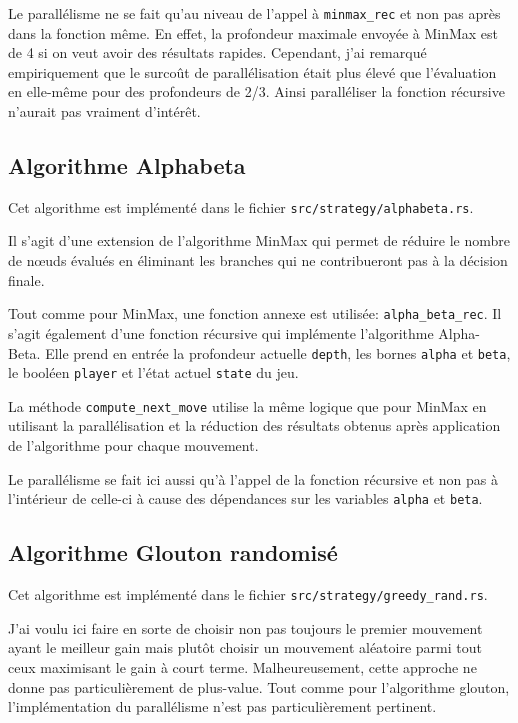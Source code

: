 \documentclass[10pt]{article}
\begin{document}
Le parallélisme ne se fait qu'au niveau de l'appel à \verb|minmax_rec| et non pas après dans la fonction même. En effet, la profondeur maximale envoyée à MinMax est de 4 si on veut avoir des résultats rapides.
Cependant, j'ai remarqué empiriquement que le surcoût de parallélisation était plus élevé que l'évaluation en elle-même pour des profondeurs de 2/3. Ainsi paralléliser la fonction récursive n'aurait pas vraiment d'intérêt.

\subsection{Algorithme Alphabeta}

Cet algorithme est implémenté dans le fichier \verb|src/strategy/alphabeta.rs|.

Il s'agit d'une extension de l'algorithme MinMax qui permet de réduire le nombre de nœuds évalués en éliminant les branches qui ne contribueront pas à la décision finale.

Tout comme pour MinMax, une fonction annexe est utilisée: \verb|alpha_beta_rec|.
Il s'agit également d'une fonction récursive qui implémente l'algorithme Alpha-Beta. Elle prend en entrée la profondeur actuelle \verb|depth|, les bornes \verb|alpha| et \verb|beta|, le booléen \verb|player| et l'état actuel \verb|state| du jeu.

La méthode \verb|compute_next_move| utilise la même logique que pour MinMax en utilisant la parallélisation et la réduction des résultats obtenus après application de l'algorithme pour chaque mouvement.

Le parallélisme se fait ici aussi qu'à l'appel de la fonction récursive et non pas à l'intérieur de celle-ci à cause des dépendances sur les variables \verb|alpha| et \verb|beta|.

\subsection{Algorithme Glouton randomisé}

Cet algorithme est implémenté dans le fichier \verb|src/strategy/greedy_rand.rs|.

J'ai voulu ici faire en sorte de choisir non pas toujours le premier mouvement ayant le meilleur gain mais plutôt choisir un mouvement aléatoire parmi tout ceux maximisant le gain à court terme.
Malheureusement, cette approche ne donne pas particulièrement de plus-value.
Tout comme pour l'algorithme glouton, l'implémentation du parallélisme n'est pas particulièrement pertinent.
\end{document}
